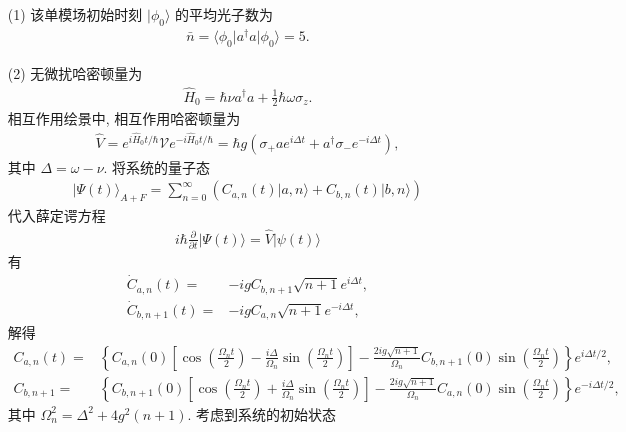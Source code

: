\documentclass{assignment}
\begin{document}
\begin{sol}
    \begin{itemize}
        \item[(1)] 该单模场初始时刻 $\lvert\phi_0\rangle$ 的平均光子数为
        \begin{align}
            \bar{n}=\langle\phi_0\rvert a^{\dagger}a\lvert\phi_0\rangle=5.
        \end{align}
        \item[(2)] 无微扰哈密顿量为
        \begin{align}
            \hat{H}_0=\hbar\nu a^{\dagger}a+\frac{1}{2}\hbar\omega\sigma_z.
        \end{align}
        相互作用绘景中, 相互作用哈密顿量为
        \begin{align}
            \hat{V}=e^{i\hat{H}_0t/\hbar}\mathscr{V}e^{-i\hat{H}_0t/\hbar}=\hbar g(\sigma_+ae^{i\Delta t}+a^{\dagger}\sigma_-e^{-i\Delta t}),
        \end{align}
        其中 $\Delta=\omega-\nu$.
        将系统的量子态
        \begin{align}
            \lvert\Psi(t)\rangle_{A+F}=\sum_{n=0}^{\infty}(C_{a,n}(t)\lvert a,n\rangle+C_{b,n}(t)\lvert b,n\rangle)
        \end{align}
        代入薛定谔方程
        \begin{align}
            i\hbar\frac{\partial}{\partial t}\lvert\Psi(t)\rangle=\hat{V}\lvert\psi(t)\rangle
        \end{align}
        有
        \begin{align}
            \dot{C}_{a,n}(t)=&-igC_{b,n+1}\sqrt{n+1}e^{i\Delta t},\\
            \dot{C}_{b,n+1}(t)=&-igC_{a,n}\sqrt{n+1}e^{-i\Delta t},
        \end{align}
        解得
        \begin{align}
            C_{a,n}(t)=&\left\{C_{a,n}(0)\left[\cos\left(\frac{\Omega_nt}{2}\right)-\frac{i\Delta}{\Omega_n}\sin\left(\frac{\Omega_nt}{2}\right)\right]-\frac{2ig\sqrt{n+1}}{\Omega_n}C_{b,n+1}(0)\sin\left(\frac{\Omega_nt}{2}\right)\right\}e^{i\Delta t/2},\\
            C_{b,n+1}=&\left\{C_{b,n+1}(0)\left[\cos\left(\frac{\Omega_nt}{2}\right)+\frac{i\Delta}{\Omega_n}\sin\left(\frac{\Omega_nt}{2}\right)\right]-\frac{2ig\sqrt{n+1}}{\Omega_n}C_{a,n}(0)\sin\left(\frac{\Omega_nt}{2}\right)\right\}e^{-i\Delta t/2},
        \end{align}
        其中 $\Omega_n^2=\Delta^2+4g^2(n+1)$.
        考虑到系统的初始状态

\end{itemize}
\end{sol}
\end{document}
